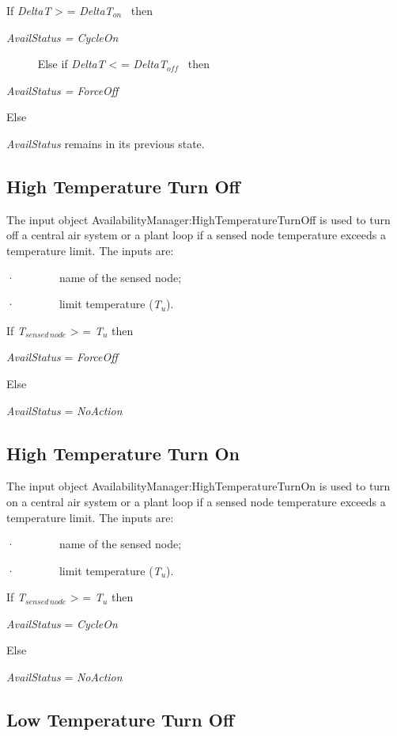 If \emph{DeltaT} \textgreater{} = \emph{DeltaT\(_{on}\)} ~then

\emph{AvailStatus = CycleOn}

~ ~~~~Else if \emph{DeltaT} \textless{} = \emph{DeltaT\(_{off}\)} ~then

\emph{AvailStatus = ForceOff}

Else

\emph{AvailStatus} remains in its previous state.

\subsection{High Temperature Turn Off}\label{high-temperature-turn-off}

The input object AvailabilityManager:HighTemperatureTurnOff is used to turn off a central air system or a plant loop if a sensed node temperature exceeds a temperature limit. The inputs are:

·~~~~~~~~name of the sensed node;

·~~~~~~~~limit temperature (\emph{T\(_{u}\)}).

If \emph{T\(_{sensed\, node}\)} \textgreater{} = \emph{T\(_{u}\)} then

\emph{AvailStatus} = \emph{ForceOff}

Else

\emph{AvailStatus} = \emph{NoAction}

\subsection{High Temperature Turn On}\label{high-temperature-turn-on}

The input object AvailabilityManager:HighTemperatureTurnOn is used to turn on a central air system or a plant loop if a sensed node temperature exceeds a temperature limit. The inputs are:

·~~~~~~~~name of the sensed node;

·~~~~~~~~limit temperature (\emph{T\(_{u}\)}).

If \emph{T\(_{sensed\, node}\)} \textgreater{} = \emph{T\(_{u}\)} then

\emph{AvailStatus} = \emph{CycleOn}

Else

\emph{AvailStatus} = \emph{NoAction}

\subsection{Low Temperature Turn Off}\label{low-temperature-turn-off}

